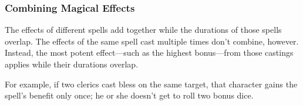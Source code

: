 \documentclass[
]{article}
\begin{document}
\hypertarget{combining-magical-effects}{%
\subsubsection{Combining Magical
Effects}\label{combining-magical-effects}}

The effects of different spells add together while the durations of
those spells overlap. The effects of the same spell cast multiple times
don't combine, however. Instead, the most potent effect---such as the
highest bonus---from those castings applies while their durations
overlap.

For example, if two clerics cast bless on the same target, that
character gains the spell's benefit only once; he or she doesn't get to
roll two bonus dice.
\end{document}
